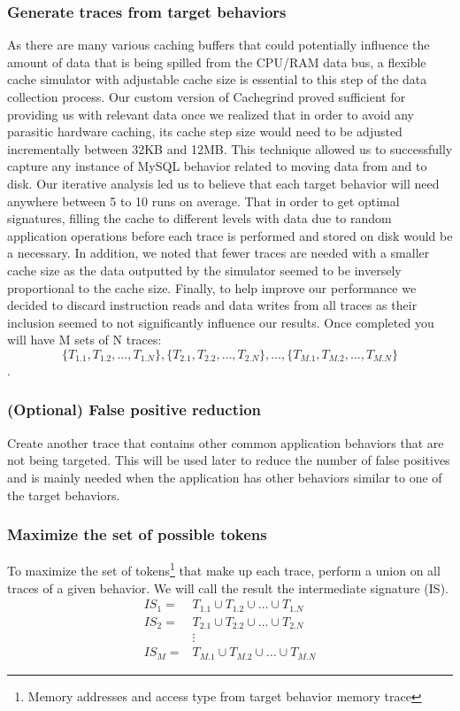 \documentclass[11pt, oneside]{article}
\begin{document}
\subsubsection{Generate traces from target behaviors}
As there are many various caching buffers that could potentially influence the 
amount of data that is being spilled from the CPU/RAM data bus, a flexible 
cache simulator with adjustable cache size is essential to this step of the 
data collection process. Our custom version of Cachegrind proved sufficient 
for providing us with relevant data once we realized that in order to avoid 
any parasitic hardware caching, its cache step size would need to be adjusted 
incrementally between 32KB and 12MB. This technique allowed us to successfully 
capture any instance of MySQL behavior related to moving data from and to 
disk.  Our iterative analysis led us to believe that each target behavior will 
need anywhere between 5 to 10 runs on average. That in order to get optimal 
signatures, filling the cache to different levels with data due to random 
application operations before each trace is performed and stored on disk would 
be a necessary. In addition, we noted that fewer traces are needed with a 
smaller cache size as the data outputted by the simulator seemed to be 
inversely proportional to the cache size. Finally, to help improve our 
performance we decided to discard instruction reads and data writes from all 
traces as their inclusion seemed to not significantly influence our results.
Once completed you will have M sets of N traces:
$$\{T_{1.1}, T_{1.2}, \ldots, T_{1.N}\}, 
  \{T_{2.1}, T_{2.2}, \ldots, T_{2.N}\},
  \ldots,
  \{T_{M.1}, T_{M.2}, \ldots, T_{M.N}\}$$.

\subsubsection{(Optional) False positive reduction}
Create another trace that contains other common application behaviors that are 
not being targeted. This will be used later to reduce the number of false 
positives and is mainly needed when the application has other behaviors 
similar to one of the target behaviors.

\subsubsection{Maximize the set of possible tokens}
To maximize the set of tokens\footnote{Memory addresses and access type from 
target behavior memory trace} that make up each trace, perform a union on all 
traces of a given behavior.  We will call the result the intermediate 
signature (IS).
\begin{align*}
IS_1 =& T_{1.1}\cup T_{1.2}\cup\ldots\cup T_{1.N} \\
IS_2 =& T_{2.1}\cup T_{2.2}\cup\ldots\cup T_{2.N} \\
      &\vdots \\
IS_M =& T_{M.1}\cup T_{M.2}\cup\ldots\cup T_{M.N}
\end{align*}
\end{document}
